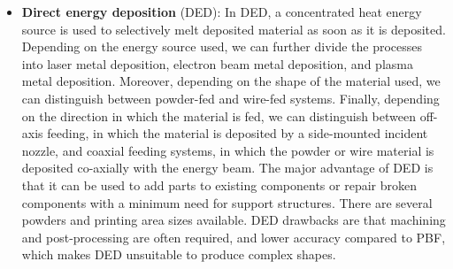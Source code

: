 \begin{itemize}
    \item \textbf{Direct energy deposition} (DED): In DED, a concentrated heat energy source is used to selectively melt deposited material as soon as it is deposited. Depending on the energy source used, we can further divide the processes into laser metal deposition, electron beam metal deposition, and plasma metal deposition. Moreover, depending on the shape of the material used, we can distinguish between powder-fed and wire-fed systems. Finally, depending on the direction in which the material is fed, we can distinguish between off-axis feeding, in which the material is deposited by a side-mounted incident nozzle, and coaxial feeding systems, in which the powder or wire material is deposited co-axially with the energy beam. The major advantage of DED is that it can be used to add parts to existing components or repair broken components with a minimum need for support structures. There are several powders and printing area sizes available. DED drawbacks are that machining and post-processing are often required, and lower accuracy compared to PBF, which makes DED unsuitable to produce complex shapes.
    \end{itemize}




